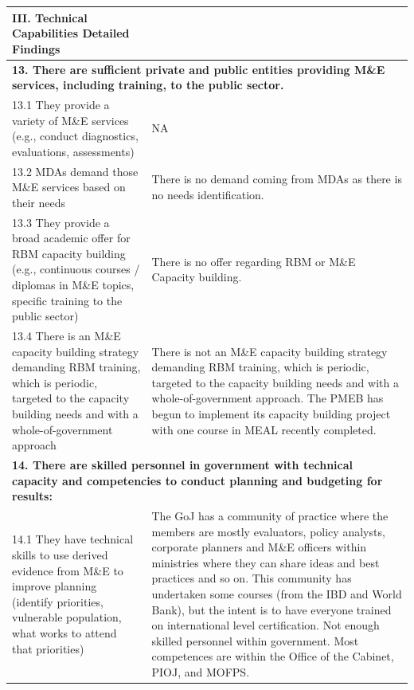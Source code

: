 \documentclass[
  10pt,
]{book}
\begin{document}
\begin{table}
\centering
\begin{tabular}[t]{l|l}
\hline
III. Technical Capabilities Detailed Findings &  \\
\hline
\multicolumn{2}{l}{\textbf{13. There are sufficient private and public entities providing M\&E services, including training, to the public sector.}}\\
\hline
\hspace{1em}13.1 They provide a variety of M\&E services (e.g., conduct diagnostics, evaluations, assessments) & NA\\
\hline
\hspace{1em}13.2 MDAs demand those M\&E services based on their needs & There is no demand coming from MDAs as there is no needs identification.\\
\hline
\hspace{1em}13.3 They provide a broad academic offer for RBM capacity building (e.g., continuous courses / diplomas in M\&E topics, specific training to the public sector) & There is no offer regarding RBM or M\&E Capacity building.\\
\hline
\hspace{1em}13.4 There is an M\&E capacity building strategy demanding RBM training, which is periodic, targeted to the capacity building needs and with a whole-of-government approach & There is not an M\&E capacity building strategy demanding RBM training, which is periodic, targeted to the capacity building needs and with a whole-of-government approach. The PMEB has begun to implement its capacity building project with one course in MEAL recently completed.\\
\hline
\multicolumn{2}{l}{\textbf{14. There are skilled personnel in government with technical capacity and competencies to conduct planning and budgeting for results:}}\\
\hline
\hspace{1em}14.1 They have technical skills to use derived evidence from M\&E to improve planning (identify priorities, vulnerable population, what works to attend that priorities) & The GoJ has a community of practice where the members are mostly evaluators, policy analysts, corporate planners and M\&E officers within ministries where they can share ideas and best practices and so on. This community has undertaken some courses (from the IBD and World Bank), but the intent is to have everyone trained on international level certification.  Not enough skilled personnel within government. Most competences are within the Office of the Cabinet, PIOJ, and MOFPS.\\

\end{tabular}
\end{table}
\end{document}
